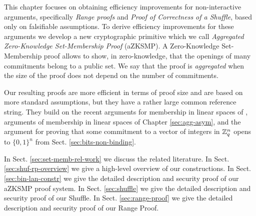 This chapter focuses on obtaining efficiency improvements for non-interactive arguments, specifically \emph{Range proofs} and \emph{Proof of Correctness of a Shuffle}, based only on falsifiable assumptions.  To derive efficiency improvements for these arguments we develop a new cryptographic primitive which we call \emph{Aggregated Zero-Knowledge Set-Membership Proof} (aZKSMP). A Zero-Knowledge Set-Membership proof allows to show, in zero-knowledge, that the openings of many commitments belong to a public set. We say that the proof is \emph{aggregated} when the size of the proof does not depend on the number of commitments.

Our resulting proofs are more efficient in terms of proof size and are based on more standard assumptions, but they have a rather large common reference string. They build on the recent arguments for membership in linear spaces of \cite{EC:LPJY14,C:JutRoy14,EC:KilWee15}, arguments of membership in linear spaces of Chapter \ref{sec:agg-asym}, and the argument for proving that some commitment to a vector of integers in $\mathbb{Z}_q^{n}$ opens to $\{0,1\}^n$ from Sect. \ref{sec:bits-non-binding}.

In Sect. \ref{sec:set-memb-rel-work} we discuss the related literature. In Sect. \ref{sec:shuf-rp-overview} we give a high-level overview of our constructions. In Sect. \ref{sec:bin-lan-constr} we give the detailed description and security proof of our aZKSMP proof system.  In Sect. \ref{sec:shuffle} we give the detailed description and security proof of our Shuffle. In Sect. \ref{sec:range-proof} we give the detailed description and security proof of our Range Proof.
 
